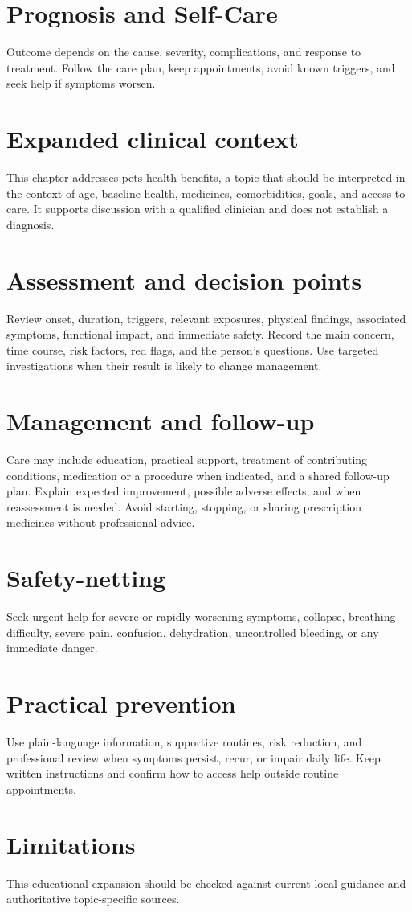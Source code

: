 \section*{Prognosis and Self-Care}
Outcome depends on the cause, severity, complications, and response to treatment. Follow the care plan, keep appointments, avoid known triggers, and seek help if symptoms worsen.

\section*{Expanded clinical context}
This chapter addresses pets health benefits, a topic that should be interpreted in the context of age, baseline health, medicines, comorbidities, goals, and access to care. It supports discussion with a qualified clinician and does not establish a diagnosis.

\section*{Assessment and decision points}
Review onset, duration, triggers, relevant exposures, physical findings, associated symptoms, functional impact, and immediate safety. Record the main concern, time course, risk factors, red flags, and the person’s questions. Use targeted investigations when their result is likely to change management.

\section*{Management and follow-up}
Care may include education, practical support, treatment of contributing conditions, medication or a procedure when indicated, and a shared follow-up plan. Explain expected improvement, possible adverse effects, and when reassessment is needed. Avoid starting, stopping, or sharing prescription medicines without professional advice.

\section*{Safety-netting}
Seek urgent help for severe or rapidly worsening symptoms, collapse, breathing difficulty, severe pain, confusion, dehydration, uncontrolled bleeding, or any immediate danger.

\section*{Practical prevention}
Use plain-language information, supportive routines, risk reduction, and professional review when symptoms persist, recur, or impair daily life. Keep written instructions and confirm how to access help outside routine appointments.

\section*{Limitations}
This educational expansion should be checked against current local guidance and authoritative topic-specific sources.
\clearpage
